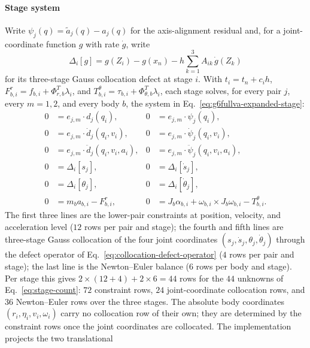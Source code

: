 \documentclass[preprint,12pt]{elsarticle}
\begin{document}
\paragraph{Stage system}
Write $\psi_j(q)=\tilde a_j(q)-a_j(q)$ for the axis-alignment residual and,
for a joint-coordinate function $g$ with rate $\dot g$, write
\begin{equation}
  \Delta_i[g]=g(Z_i)-g(x_n)-h\sum_{k=1}^3A_{ik}\,\dot g(Z_k)
  \label{eq:collocation-defect-operator}
\end{equation}
for its three-stage Gauss collocation defect at stage $i$. With
$t_i=t_n+c_ih$, $F^r_{b,i}=f_{b,i}+\Phi_{r,b}^T\lambda_i$, and
$T^\theta_{b,i}=\tau_{b,i}+\Phi_{\theta,b}^T\lambda_i$, each stage solves,
for every pair $j$, every $m=1,2$, and every body $b$, the system in
Eq.~\eqref{eq:g6fullva-expanded-stage}:
\begin{equation}
\label{eq:g6fullva-expanded-stage}
\begin{aligned}
0 &= e_{j,m}\cdot d_j(q_i), &
0 &= e_{j,m}\cdot\psi_j(q_i),\\
0 &= e_{j,m}\cdot\dot d_j(q_i,v_i), &
0 &= e_{j,m}\cdot\dot\psi_j(q_i,v_i),\\
0 &= e_{j,m}\cdot\ddot d_j(q_i,v_i,a_i), &
0 &= e_{j,m}\cdot\ddot\psi_j(q_i,v_i,a_i),\\
0 &= \Delta_i[s_j], & 0 &= \Delta_i[\dot s_j],\\
0 &= \Delta_i[\theta_j], & 0 &= \Delta_i[\dot\theta_j],\\
0 &= m_b a_{b,i}-F^r_{b,i}, &
0 &= J_b\alpha_{b,i}+\omega_{b,i}\times J_b\omega_{b,i}-T^\theta_{b,i} .
\end{aligned}
\end{equation}
The first three lines are the lower-pair constraints at position, velocity,
and acceleration level ($12$ rows per pair and stage); the fourth and fifth
lines are three-stage Gauss collocation of the four joint coordinates
$(s_j,\dot s_j,\theta_j,\dot\theta_j)$ through the defect operator of
Eq.~\eqref{eq:collocation-defect-operator} ($4$ rows per pair and stage); the
last line is the Newton--Euler balance ($6$ rows per body and stage). Per
stage this gives $2\times(12+4)+2\times 6=44$ rows for the $44$ unknowns of
Eq.~\eqref{eq:stage-count}: $72$ constraint rows, $24$ joint-coordinate
collocation rows, and $36$ Newton--Euler rows over the three stages. The
absolute body coordinates $(r_i,\eta_i,v_i,\omega_i)$ carry no collocation
row of their own; they are determined by the constraint rows once the joint
coordinates are collocated. The implementation projects the two translational
\end{document}
